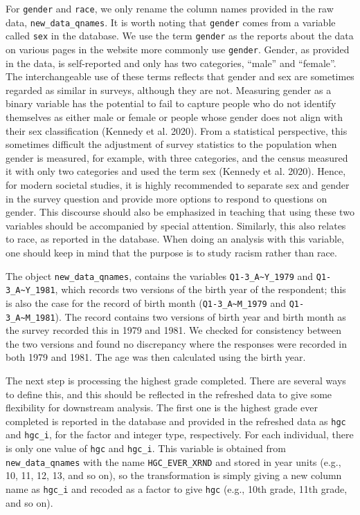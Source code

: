 \documentclass[12pt]{article}
\begin{document}
For \texttt{gender} and \texttt{race}, we only rename the column names provided in the raw data, \texttt{new\_data\_qnames}. It is worth noting that \texttt{gender} comes from a variable called \texttt{sex} in the database. We use the term \texttt{gender} as the reports about the data on various pages in the website more commonly use \texttt{gender}. Gender, as provided in the data, is self-reported and only has two categories, ``male'' and ``female''. The interchangeable use of these terms reflects that gender and sex are sometimes regarded as similar in surveys, although they are not. Measuring gender as a binary variable has the potential to fail to capture people who do not identify themselves as either male or female or people whose gender does not align with their sex classification (Kennedy et al. 2020). From a statistical perspective, this sometimes difficult the adjustment of survey statistics to the population when gender is measured, for example, with three categories, and the census measured it with only two categories and used the term sex (Kennedy et al. 2020). Hence, for modern societal studies, it is highly recommended to separate sex and gender in the survey question and provide more options to respond to questions on gender. This discourse should also be emphasized in teaching that using these two variables should be accompanied by special attention. Similarly, this also relates to race, as reported in the database. When doing an analysis with this variable, one should keep in mind that the purpose is to study racism rather than race.

The object \texttt{new\_data\_qnames}, contains the variables \texttt{Q1-3\_A\textasciitilde{}Y\_1979} and \texttt{Q1-3\_A\textasciitilde{}Y\_1981}, which records two versions of the birth year of the respondent; this is also the case for the record of birth month (\texttt{Q1-3\_A\textasciitilde{}M\_1979} and \texttt{Q1-3\_A\textasciitilde{}M\_1981}). The record contains two versions of birth year and birth month as the survey recorded this in 1979 and 1981. We checked for consistency between the two versions and found no discrepancy where the responses were recorded in both 1979 and 1981. The age was then calculated using the birth year.

The next step is processing the highest grade completed. There are several ways to define this, and this should be reflected in the refreshed data to give some flexibility for downstream analysis. The first one is the highest grade ever completed is reported in the database and provided in the refreshed data as \texttt{hgc} and \texttt{hgc\_i}, for the factor and integer type, respectively. For each individual, there is only one value of \texttt{hgc} and \texttt{hgc\_i}. This variable is obtained from \texttt{new\_data\_qnames} with the name \texttt{HGC\_EVER\_XRND} and stored in year units (e.g., 10, 11, 12, 13, and so on), so the transformation is simply giving a new column name as \texttt{hgc\_i} and recoded as a factor to give \texttt{hgc} (e.g., 10th grade, 11th grade, and so on).
\end{document}
